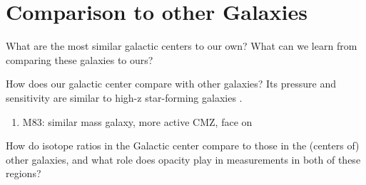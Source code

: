 \section{Comparison to other Galaxies}
What are the most similar galactic centers to our own?
What can we learn from comparing these galaxies to ours?

How does our galactic center compare with other galaxies?  Its pressure and sensitivity are similar to high-z star-forming galaxies \citep{Kruijssen2013a}.  


\begin{enumerate}
    \item M83: similar mass galaxy, more active CMZ, face on
\end{enumerate}

How do isotope ratios in the Galactic center compare to those in the (centers of) other galaxies, and what role does opacity play in measurements in both of these regions?